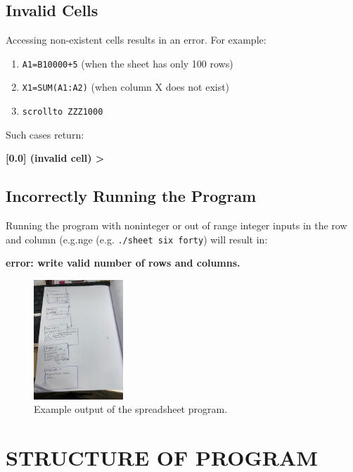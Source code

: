 \documentclass[a4paper]{article}
\begin{document}
\subsection{Invalid Cells}
Accessing non-existent cells results in an error. For example:
\begin{enumerate}
    \item \texttt{A1=B10000+5} (when the sheet has only 100 rows)
    \item \texttt{X1=SUM(A1:A2)} (when column X does not exist)
    \item \texttt{scrollto ZZZ1000} 
\end{enumerate}
Such cases return:
\begin{center}
    \textbf{[0.0] (invalid cell) >}
\end{center}

\subsection{Incorrectly Running the Program}
Running the program with noninteger or out of range integer inputs in the row and column (e.g.nge (e.g. \texttt{./sheet six forty}) will result in:
\begin{center}
    \textbf{error: write valid number of rows and columns.}
\end{center}

\begin{figure}
\centering
\includegraphics[width=0.3\textwidth]{copass.jpg}
\caption{Example output of the spreadsheet program.}
\end{figure}

\section{STRUCTURE OF PROGRAM}
\end{document}
